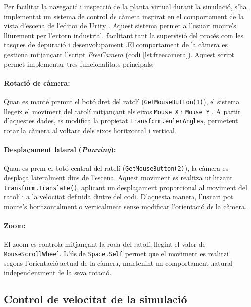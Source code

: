 \documentclass[a4paper,11pt,DIV=13,headings=normal,abstract=true,twoside=semi]{article}
\begin{document}
Per facilitar la navegació i inspecció de la planta virtual durant la simulació, s'ha implementat un sistema de control de càmera inspirat en el comportament de la vista d'escena de l'editor de Unity \cite{UnitySceneNavigation}. Aquest sistema permet a l'usuari moure's lliurement per l'entorn industrial, facilitant tant la supervisió del procés com les tasques de depuració i desenvolupament \cite{GameDeveloperCamera}.El comportament de la càmera es gestiona mitjançant l'script \textit{FreeCamera} (codi \ref{lst:freecamera}). Aquest script permet implementar tres funcionalitats principals:

\paragraph{Rotació de càmera:} Quan es manté premut el botó dret del ratolí (\texttt{GetMouseButton(1)}), el sistema llegeix el moviment del ratolí mitjançant els eixos \texttt{Mouse X} i \texttt{Mouse Y} \cite{UnityInput}. A partir d'aquestes dades, es modifica la propietat \texttt{transform.eulerAngles}, permetent rotar la càmera al voltant dels eixos horitzontal i vertical. 

\paragraph{Desplaçament lateral (\textit{Panning}):} Quan es prem el botó central del ratolí (\texttt{GetMouseButton(2)}), la càmera es desplaça lateralment dins de l'escena. Aquest moviment es realitza utilitzant \texttt{transform.Translate()}, aplicant un desplaçament proporcional al moviment del ratolí i a la velocitat definida dintre del codi. D'aquesta manera, l'usuari pot moure's horitzontalment o verticalment sense modificar l'orientació de la càmera.

\paragraph{Zoom:} El zoom es controla mitjançant la roda del ratolí, llegint el valor de \texttt{MouseScrollWheel}. L'ús de \texttt{Space.Self} \cite{UnityTransformTranslate} permet que el moviment es realitzi segons l'orientació actual de la càmera, mantenint un comportament natural independentment de la seva rotació.



\subsection{Control de velocitat de la simulació}
\end{document}
